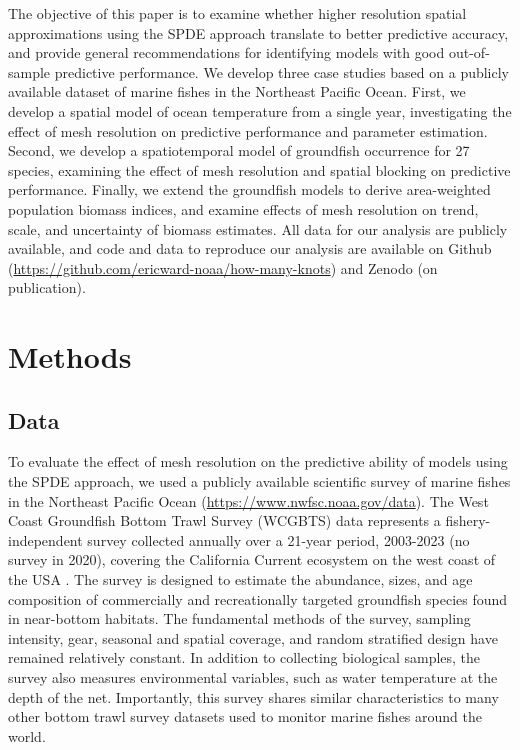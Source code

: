 \documentclass[11pt]{article}
\begin{document}
The objective of this paper is to examine whether higher resolution spatial
approximations using the SPDE approach translate to better predictive accuracy,
and provide general recommendations for identifying models with good
out-of-sample predictive performance. We develop three case studies based on a
publicly available dataset of marine fishes in the Northeast Pacific Ocean.
First, we develop a spatial model of ocean temperature from a single year,
investigating the effect of mesh resolution on predictive performance and
parameter estimation. Second, we develop a spatiotemporal model of groundfish
occurrence for 27 species, examining the effect of mesh resolution and spatial
blocking on predictive performance. Finally, we extend the groundfish models to
derive area-weighted population biomass indices, and examine effects of mesh
resolution on trend, scale, and uncertainty of biomass estimates. All data for
our analysis are publicly available, and code and data to reproduce our
analysis are available on Github
(\url{https://github.com/ericward-noaa/how-many-knots}) and Zenodo (on
publication).

\section{Methods}\label{methods}

\subsection{Data}

To evaluate the effect of mesh resolution on the predictive ability of
models using the SPDE approach, we used a publicly available scientific
survey of marine fishes in the Northeast Pacific Ocean
(\url{https://www.nwfsc.noaa.gov/data}). The West Coast Groundfish
Bottom Trawl Survey (WCGBTS) data represents a fishery-independent
survey collected annually over a 21-year period, 2003-2023 (no survey in
2020), covering the California Current ecosystem on the west coast of
the USA \citep{keller_northwest_2017}. The survey is designed to
estimate the abundance, sizes, and age composition of commercially and
recreationally targeted groundfish species found in near-bottom
habitats. The fundamental methods of the survey, sampling intensity,
gear, seasonal and spatial coverage, and random stratified design have
remained relatively constant. In addition to collecting biological
samples, the survey also measures environmental variables, such as water
temperature at the depth of the net. Importantly, this survey shares
similar characteristics to many other bottom trawl survey datasets used
to monitor marine fishes around the world.
\end{document}
